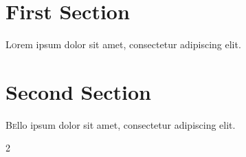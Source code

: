 \documentclass{article}
\begin{document}
    \begin{multicols}{2}
        \section{First Section}        
        \lettrine[nindent=0em,findent=0.5em,lines=3]{L} orem ipsum dolor sit amet, consectetur adipiscing elit.
        \lipsum[2-3]

        \section{Second Section}
        \lettrine[nindent=1em,lines=3]{\color{red-600}B} ello ipsum dolor sit amet, consectetur adipiscing elit.
        \lipsum[4]
    \end{multicols}{2}
    
\end{document}
